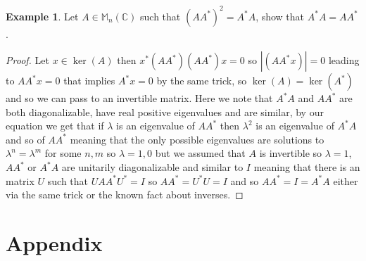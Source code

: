 \documentclass[12pt]{article}
\theoremstyle{definition}
\newtheorem*{example}{Example}
\theoremstyle{remark}
\theoremstyle{plain}
\begin{document}
\begin{example}
    Let $A\in \mathbb{M}_n(\mathbb{C})$ such that $(AA^*)^2=A^*A$, show that $A^*A=AA^*$.
\begin{proof}
    Let $x\in \ker(A)$ then $x^*(AA^*) (AA^*)x=0$ so $|(AA^*x)|=0$ leading to $AA^*x=0$ that implies $A^*x=0$ by the same trick, so $\ker(A)=\ker(A^*)$ and so we can pass to an invertible matrix. Here we note that $A^*A$ and $AA^*$ are both diagonalizable, have real positive eigenvalues and are similar, by our equation we get that if $\lambda$ is an eigenvalue of $AA^*$ then $\lambda^2$ is an eigenvalue of $A^*A$ and so of $AA^*$ meaning that the only possible eigenvalues are solutions to $\lambda^n=\lambda^m$ for some $n,m$ so $\lambda=1,0$ but we assumed that $A$ is invertible so $\lambda =1$, $AA^*$ or $A^*A$ are unitarily diagonalizable and similar to $I$ meaning that there is an matrix $U$ such that $UAA^*U^*=I$ so $AA^*=U^*U=I$ and so $AA^*=I=A^*A$ either via the same trick or the known fact about inverses. 
\end{proof}
\end{example}

\newpage

\section{Appendix}
\end{document}
